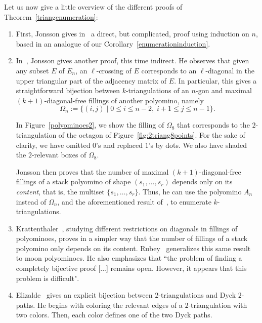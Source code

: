 \documentclass[12pt]{amsart}
\begin{document}
Let us now give a little overview of the different proofs of Theorem~\ref{triangenumeration}:

\begin{enumerate}
\item First, Jonsson gives in~\cite{j-gt-03} a direct, but complicated, proof using induction on $n$, based in an analogue of our Corollary~\ref{enumerationinduction}.

\item In~\cite{j-gtdfssp-05}, Jonsson gives another proof, this time indirect. He observes that given any subset $E$ of $E_n$, an $\ell$-crossing of $E$ corresponds to an $\ell$-diagonal in the upper triangular part of the adjacency matrix of $E$. In particular, this gives a straightforward bijection between $k$-triangulations of an $n$-gon and maximal $(k+1)$-diagonal-free fillings of another polyomino, namely
$$\Omega_n:=\{(i,j)\;|\; 0\le i\le n-2,\; i+1\le j\le n-1\}.$$

\begin{example}
\rm
In Figure~\ref{polyominoes2}, we show the filling of $\Omega_8$ that corresponds to the $2$-triangulation of the octagon of Figure~\ref{fig:2triang8points}. For the sake of clarity, we have omitted $0$'s and replaced $1$'s by dots. We also have shaded the $2$-relevant boxes of $\Omega_8$.
\end{example}

\noindent Jonsson then proves that the number of maximal $(k+1)$-diagonal-free fillings of a stack polyomino of shape $(s_1,\ldots,s_r)$ depends only on its \emph{content}, that is, the multiset $\{s_1,\ldots,s_r\}$. Thus, he can use the polyomino $A_n$ instead of $\Omega_n$, and the aforementioned result of~\cite{ht-gbmdpi-92}, to enumerate $k$-triangulations.

\item Krattenthaler~\cite{k-gdidcffs-06}, studying different restrictions on diagonals in fillings of polyominoes, proves in a simpler way that the number of fillings of a stack polyomino only depends on its content. Rubey~\cite{r-idsfmp-07} generalizes this same result to moon polyominoes. He also emphasizes that ``the problem of finding a completely bijective proof [...] remains open. However, it appears that this problem is difficult".

\item Elizalde~\cite{e-btdp-06} gives an explicit bijection between $2$-triangu\-lations and Dyck $2$-paths. He begins with coloring the relevant edges of a $2$-triangulation with two colors. Then, each color defines one of the two Dyck paths.

\end{enumerate}
\end{document}
